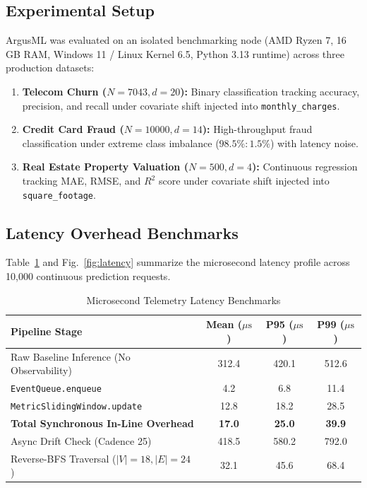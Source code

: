\documentclass[conference]{IEEEtran}
\begin{document}
\subsection{Experimental Setup}
ArgusML was evaluated on an isolated benchmarking node (AMD Ryzen 7, 16 GB RAM, Windows 11 / Linux Kernel 6.5, Python 3.13 runtime) across three production datasets:
\begin{enumerate}
    \item \textbf{Telecom Churn ($N=7043, d=20$):} Binary classification tracking accuracy, precision, and recall under covariate shift injected into \texttt{monthly\_charges}.
    \item \textbf{Credit Card Fraud ($N=10000, d=14$):} High-throughput fraud classification under extreme class imbalance ($98.5\% : 1.5\%$) with latency noise.
    \item \textbf{Real Estate Property Valuation ($N=500, d=4$):} Continuous regression tracking MAE, RMSE, and $R^2$ score under covariate shift injected into \texttt{square\_footage}.
\end{enumerate}

\subsection{Latency Overhead Benchmarks}
Table~\ref{tab:latency} and Fig.~\ref{fig:latency} summarize the microsecond latency profile across 10,000 continuous prediction requests.

\begin{table}[htbp]
\caption{Microsecond Telemetry Latency Benchmarks}
\label{tab:latency}
\begin{center}
\begin{tabular}{lccc}
\toprule
\textbf{Pipeline Stage} & \textbf{Mean ($\mu\text{s}$)} & \textbf{P95 ($\mu\text{s}$)} & \textbf{P99 ($\mu\text{s}$)} \\
\midrule
Raw Baseline Inference (No Observability) & 312.4 & 420.1 & 512.6 \\
\texttt{EventQueue.enqueue} & 4.2 & 6.8 & 11.4 \\
\texttt{MetricSlidingWindow.update} & 12.8 & 18.2 & 28.5 \\
\textbf{Total Synchronous In-Line Overhead} & \textbf{17.0} & \textbf{25.0} & \textbf{39.9} \\
Async Drift Check (Cadence 25) & 418.5 & 580.2 & 792.0 \\
Reverse-BFS Traversal ($|V|=18, |E|=24$) & 32.1 & 45.6 & 68.4 \\
\bottomrule
\end{tabular}
\end{center}
\end{table}
\end{document}

